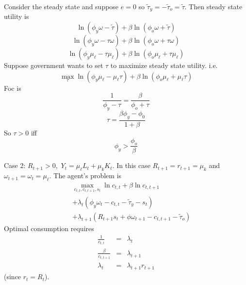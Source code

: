 \documentclass{sebase}
\begin{document}
Consider the steady state and suppose $e=0$ so $\tilde{\tau}_{y}=-\tilde{\tau%
}_{o}=\tilde{\tau}.$ Then steady state utility is%
\begin{equation*}
\ln \left( \phi _{y}\omega -\tilde{\tau}\right) +\beta \ln \left( \phi
_{o}\omega +\tilde{\tau}\right)
\end{equation*}
\begin{equation*}
\ln \left( \phi _{y}\omega -\tau \omega \right) +\beta \ln \left( \phi
_{o}\omega +\tau \omega \right)
\end{equation*}
\begin{equation*}
\ln \left( \phi _{y}\mu _{\ell }-\tau \mu _{\ell }\right) +\beta \ln \left(
\phi _{o}\mu _{\ell }+\tau \mu _{\ell }\right)
\end{equation*}%
Suppose government wants to set $\tau $ to maximize steady state utility.
i.e. 
\begin{equation*}
\underset{\tau }{\max }\ln \left( \phi _{y}\mu _{\ell }-\mu _{\ell }\tau
\right) +\beta \ln \left( \phi _{o}\mu _{\ell }+\mu _{\ell }\tau \right)
\end{equation*}%
Foc is 
\begin{equation*}
\frac{1}{\phi _{y}-\tau }=\frac{\beta }{\phi _{o}+\tau }
\end{equation*}%
\begin{equation*}
\tau =\frac{\beta \phi _{y}-\phi _{0}}{1+\beta }
\end{equation*}%
So $\tau >0$ iff%
\begin{equation*}
\phi _{y}>\frac{\phi _{o}}{\beta }
\end{equation*}

\pagebreak

Case 2: $R_{t+1}>0,$ $Y_{t}=\mu _{\ell }L_{t}+\mu _{k}K_{t}$. In this case $%
R_{t+1}=r_{t+1}=\mu _{k}$ and $\omega _{t+1}=\omega _{t}=\mu _{\ell }.$ The
agent's problem is 
\begin{eqnarray*}
&&\underset{c_{t,t},c_{t,t+1},s_{t}}{\max }\ln c_{t,t}+\beta \ln c_{t,t+1} \\
&&+\lambda _{t}\left( \phi _{y}\omega _{t}-c_{t,t}-\tilde{\tau}%
_{y}-s_{t}\right) \\
&&+\lambda _{t+1}\left( R_{t+1}s_{t}+\phi \omega _{t+1}-c_{t,t+1}-\tilde{\tau%
}_{o}\right)
\end{eqnarray*}%
Optimal consumption requires 
\begin{eqnarray*}
\frac{1}{c_{t,t}} &=&\lambda _{t} \\
\frac{\beta }{c_{t,t+1}} &=&\lambda _{t+1} \\
\lambda _{t} &=&\lambda _{t+1}r_{t+1}
\end{eqnarray*}%
(since $r_{t}=R_{t}$).\pagebreak
\end{document}
